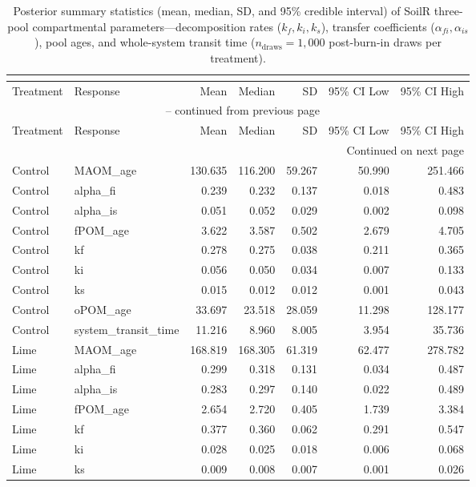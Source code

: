 \documentclass[preprint,12pt]{elsarticle}
\begin{document}
\begin{landscape}
\begin{longtable}{llrrrrr}
\caption{Posterior summary statistics (mean, median, SD, and 95\% credible interval) of SoilR three-pool compartmental parameters—decomposition rates ($k_f, k_i, k_s$), transfer coefficients ($\alpha_{fi}, \alpha_{is}$), pool ages, and whole-system transit time ($n_{\text{draws}} = 1,000$ post-burn-in draws per treatment).}\\
\label{tab:soilr_means}\\
\toprule
Treatment & Response & Mean & Median & SD & 95\% CI Low & 95\% CI High \\
\midrule
\endfirsthead
\multicolumn{7}{c}{{\tablename\ \thetable{} -- continued from previous page}} \\
\toprule
Treatment & Response & Mean & Median & SD & 95\% CI Low & 95\% CI High \\
\midrule
\endhead
\midrule \multicolumn{7}{r}{{Continued on next page}} \\ \endfoot
\bottomrule \endlastfoot
Control & MAOM\_age & 130.635 & 116.200 & 59.267 & 50.990 & 251.466 \\
Control & alpha\_fi & 0.239 & 0.232 & 0.137 & 0.018 & 0.483 \\
Control & alpha\_is & 0.051 & 0.052 & 0.029 & 0.002 & 0.098 \\
Control & fPOM\_age & 3.622 & 3.587 & 0.502 & 2.679 & 4.705 \\
Control & kf & 0.278 & 0.275 & 0.038 & 0.211 & 0.365 \\
Control & ki & 0.056 & 0.050 & 0.034 & 0.007 & 0.133 \\
Control & ks & 0.015 & 0.012 & 0.012 & 0.001 & 0.043 \\
Control & oPOM\_age & 33.697 & 23.518 & 28.059 & 11.298 & 128.177 \\
Control & system\_transit\_time & 11.216 & 8.960 & 8.005 & 3.954 & 35.736 \\
Lime & MAOM\_age & 168.819 & 168.305 & 61.319 & 62.477 & 278.782 \\
Lime & alpha\_fi & 0.299 & 0.318 & 0.131 & 0.034 & 0.487 \\
Lime & alpha\_is & 0.283 & 0.297 & 0.140 & 0.022 & 0.489 \\
Lime & fPOM\_age & 2.654 & 2.720 & 0.405 & 1.739 & 3.384 \\
Lime & kf & 0.377 & 0.360 & 0.062 & 0.291 & 0.547 \\
Lime & ki & 0.028 & 0.025 & 0.018 & 0.006 & 0.068 \\
Lime & ks & 0.009 & 0.008 & 0.007 & 0.001 & 0.026 \\

\end{longtable}
\end{landscape}
\end{document}
